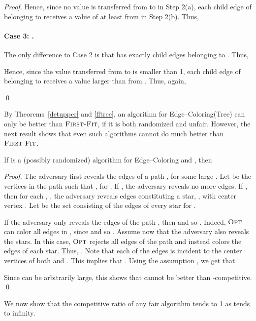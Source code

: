 \documentclass[smallextended]{svjour3}
\def\mck{{\sc Edge--Coloring}\xspace}
\def\mctree{{\sc Edge--Coloring(Tree)}\xspace}
\newcommand{\FF}{\ensuremath{\operatorname{\textsc{First-Fit}}}\xspace}
\newcommand{\OPT}{\ensuremath{\operatorname{\textsc{Opt}}}\xspace}
\begin{document}
\begin{proof}
Hence, since no value is transferred from  to  in Step 2(a), each
 child edge of  belonging to  receives a value of at least  from  in Step 2(b).
Thus,


\paragraph{Case 3: .}
The only difference to Case 2 is that  has exactly  child
 edges belonging to .
Thus,

Hence, since the value transferred from  to  is smaller than 1,
 each child edge of  belonging to  receives a value larger than
  from .
Thus, again,

\mbox{}\qed\end{proof}

By Theorems~\ref{detupper} and \ref{fftree}, an algorithm for \mctree
 can only be better than \FF, if it is both randomized and unfair.
However, the next result shows that even such algorithms cannot do much better than \FF.

\begin{theorem}
If  is a (possibly randomized) algorithm for \mck and , then
 
\end{theorem}
\begin{proof}
The adversary first reveals the edges of a path , for some large .
Let  be the vertices in the path such that
 , for . 
If , the adversary reveals no more
edges.  
If , then for each , ,
 the adversary reveals  edges constituting a star, , with
 center vertex . 
Let  be the set consisting of the edges of every star  for .

If the adversary only reveals the edges of the path , then  and so . Indeed, \OPT can color all  edges in , since  and so . Assume now that the adversary also reveals the stars. In this case, \OPT rejects all edges of the path and instead colors the  edges of each star. Thus, . Note that each of the edges  is incident to the center vertices of both  and . This implies that . Using the assumption , we get that

Since  can be arbitrarily large, this shows that  cannot be better than -competitive.
\qed\end{proof}

We now show that 
the competitive ratio of any fair algorithm tends to 1 as  tends to infinity.
\end{document}
